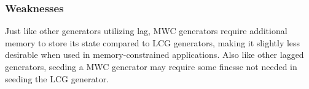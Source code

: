 \subsubsection{Weaknesses}
Just like other generators utilizing lag, MWC generators require additional memory to store its state compared to LCG generators, making it slightly less desirable when used in memory-constrained applications. Also like other lagged generators, seeding a MWC generator may require some finesse not needed in seeding the LCG generator.
